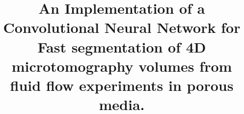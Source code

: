 \documentclass[draft,linenumbers]{agujournal2018}
\begin{document}
%
%


\title{An Implementation of a Convolutional Neural Network for Fast segmentation of 4D microtomography volumes from fluid flow experiments in porous media.}

%
%











\end{document}
